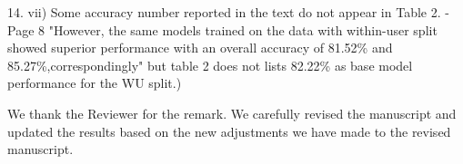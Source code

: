 \documentclass[a4paper, onecolumn]{IEEEtran}
\newcommand\blue[1]{{\textcolor{white!30!blue}{#1}}}
\begin{document}
\blue{14. vii) Some accuracy number reported in the text do not appear in Table 2.
- Page 8 "However, the same models trained on the data with within-user split showed superior performance with an overall accuracy of 81.52\% and 85.27\%,correspondingly" but table 2 does not lists 82.22\% as base model performance for the WU split.)}

We thank the Reviewer for the remark. We carefully revised the manuscript and updated the results based on the new adjustments we have made to the revised manuscript. 
\end{document}
